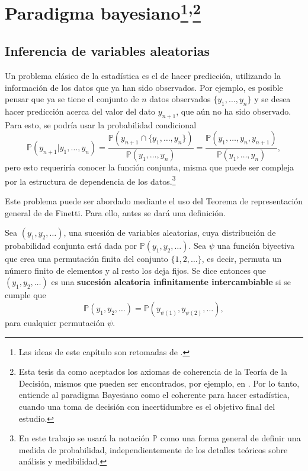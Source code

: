 \chapter[Paradigma Bayesiano]{Paradigma bayesiano\footnote{Las ideas de este cap\'itulo son retomadas de \cite{Denison_BayesMethods}.}\textsuperscript{,}\footnote{Esta tesis da como aceptados los axiomas de coherencia de la Teoría de la Decisión, mismos que pueden ser encontrados, por ejemplo, en \cite{Fishburn_Axioms}. Por lo tanto, entiende al paradigma Bayesiano como el coherente para hacer estad\'istica, cuando una toma de decisi\'on con incertidumbre es el objetivo final del estudio. 
}}
\label{chap:Bayesian}

\section{Inferencia de variables aleatorias}

Un problema clásico de la estad\'istica es el de hacer predicci\'on, utilizando la informaci\'on de los datos que ya han sido observados. Por ejemplo, es posible pensar que ya se tiene el conjunto de $n$ datos observados $\{y_1, \ldots, y_n\}$ y se desea hacer predicci\'on acerca del valor del dato $y_{n+1}$, que a\'un no ha sido observado. Para esto, se podr\'ia usar la probabilidad condicional
\begin{equation*}
    \mathbb{P}(y_{n+1}|y_1,\ldots,y_n) =
    \frac{\mathbb{P}(y_{n+1} \cap \{y_1, \ldots, y_n\})}{\mathbb{P}(y_1, \ldots, y_n)} =
    \frac{\mathbb{P}(y_1, \ldots, y_n,y_{n+1})}{\mathbb{P}(y_1, \ldots, y_n)},
\end{equation*}
pero esto requerir\'ia conocer la funci\'on conjunta, misma que puede ser compleja por la estructura de dependencia de los datos.\footnote{En este trabajo se usar\'a la notaci\'on $\mathbb{P}$ como una forma general de definir una medida de probabilidad, independientemente de los detalles te\'oricos sobre an\'alisis y medibilidad.}

Este problema puede ser abordado mediante el uso del Teorema de representaci\'on general de de Finetti. Para ello, antes se dar\'a una definici\'on.

\begin{defin*}
    Sea $(y_1,y_2,\ldots)$, una sucesi\'on de variables aleatorias, cuya distribuci\'on de probabilidad conjunta est\'a dada por $\mathbb{P}(y_1,y_2,\ldots)$. Sea $\psi$ una funci\'on biyectiva que crea una permutaci\'on finita del conjunto $\{1,2,\ldots\}$, es decir, permuta un n\'umero finito de elementos y al resto los deja fijos.  
    Se dice entonces que $(y_1,y_2,\ldots)$ es una \textbf{sucesi\'on aleatoria infinitamente intercambiable} si se cumple que 
    \begin{equation*}
        \mathbb{P}(y_1,y_2,\ldots) = \mathbb{P}(y_{\psi(1)},y_{\psi(2)},\ldots),
    \end{equation*}
    para cualquier permutaci\'on $\psi$.
\end{defin*}

